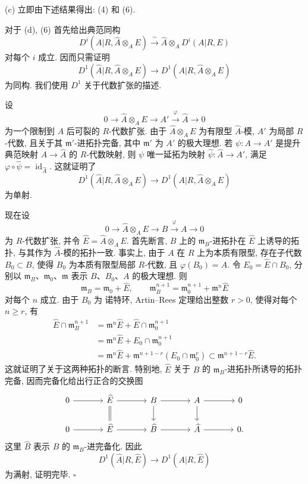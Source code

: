 (c) 立即由下述结果得出: (4) 和 (6).


对于 (d), (6) 首先给出典范同构
\[
 D^i(A|R,\widehat A\otimes_AE)
 \xrightarrow{\ \sim\ }
 \widehat A\otimes_AD^i(A|R,E)
\]
对每个 $i$ 成立. 因而只需证明
\[
 D^1(\widehat A|R,\widehat A\otimes_AE)
 \longrightarrow D^1(A|R,\widehat A\otimes_AE)
\]
为同构. 我们使用 $D^1$ 关于代数扩张的描述.

设
\[
 0\longrightarrow\widehat A\otimes_AE\longrightarrow A'
 \xrightarrow{\ \varphi\ }\widehat A\longrightarrow0
\]
为一个限制到 $A$ 后可裂的 $R$-代数扩张. 由于 $\widehat A\otimes_AE$ 为有限型 $\widehat A$-模, $A'$ 为局部 $R$-代数, 且关于其 $\mathfrak m'$-进拓扑完备, 其中 $\mathfrak m'$ 为 $A'$ 的极大理想. 若 $\psi:A\longrightarrow A'$ 是提升典范映射 $A\longrightarrow\widehat A$ 的 $R$-代数映射, 则 $\psi$ 唯一延拓为映射 $\widehat\psi:\widehat A\longrightarrow A'$, 满足 $\varphi\circ\widehat\psi=\operatorname{id}_{\widehat A}$. 这就证明了
\[
 D^1(\widehat A|R,\widehat A\otimes_AE)
 \longrightarrow D^1(A|R,\widehat A\otimes_AE)
\]
为单射.


现在设
\[
 0\longrightarrow\widehat A\otimes_AE\longrightarrow B
 \xrightarrow{\ \varphi\ }A\longrightarrow0
\]
为 $R$-代数扩张, 并令 $\widehat E=\widehat A\otimes_AE$. 首先断言, $B$ 上的 $\mathfrak m_B$-进拓扑在 $\widehat E$ 上诱导的拓扑, 与其作为 $\widehat A$-模的拓扑一致. 事实上, 由于 $A$ 在 $R$ 上为本质有限型, 存在子代数 $B_0\subset B$, 使得 $B_0$ 为本质有限型局部 $R$-代数, 且 $\varphi(B_0)=A$. 令 $E_0=\widehat E\cap B_0$, 分别以 $\mathfrak m_B$、$\mathfrak m_0$、$\mathfrak m$ 表示 $B$、$B_0$、$A$ 的极大理想. 则
\[
 \mathfrak m_B=\mathfrak m_0+\widehat E,
 \qquad
 \mathfrak m_B^{n+1}=\mathfrak m_0^{n+1}
   +\mathfrak m^n\widehat E
\]
对每个 $n$ 成立. 由于 $B_0$ 为 诺特环, Artin--Rees 定理给出整数 $r>0$, 使得对每个 $n\geq r$, 有
\begin{align*}
 \widehat E\cap\mathfrak m_B^{n+1}
 &=\mathfrak m^n\widehat E
   +\widehat E\cap\mathfrak m_0^{n+1}\\
 &=\mathfrak m^n\widehat E
   +E_0\cap\mathfrak m_0^{n+1}\\
 &=\mathfrak m^n\widehat E
   +\mathfrak m^{n+1-r}(E_0\cap\mathfrak m_0^r)
 \subset\mathfrak m^{n+1-r}\widehat E.
\end{align*}
这就证明了关于这两种拓扑的断言. 特别地, $\widehat E$ 关于 $B$ 的 $\mathfrak m_B$-进拓扑所诱导的拓扑完备, 因而完备化给出行正合的交换图
\[
\begin{tikzcd}[column sep=large]
0 \arrow[r] & \widehat E \arrow[r] \arrow[d,equal]
& B \arrow[r] \arrow[d]
& A \arrow[r] \arrow[d] & 0 \\
0 \arrow[r] & \widehat E \arrow[r]
& \widehat B \arrow[r]
& \widehat A \arrow[r] & 0.
\end{tikzcd}
\]
这里 $\widehat B$ 表示 $B$ 的 $\mathfrak m_B$-进完备化. 因此
\[
 D^1(\widehat A|R,\widehat E)
 \longrightarrow D^1(A|R,\widehat E)
\]
为满射, 证明完毕.
\hfill$\square$

